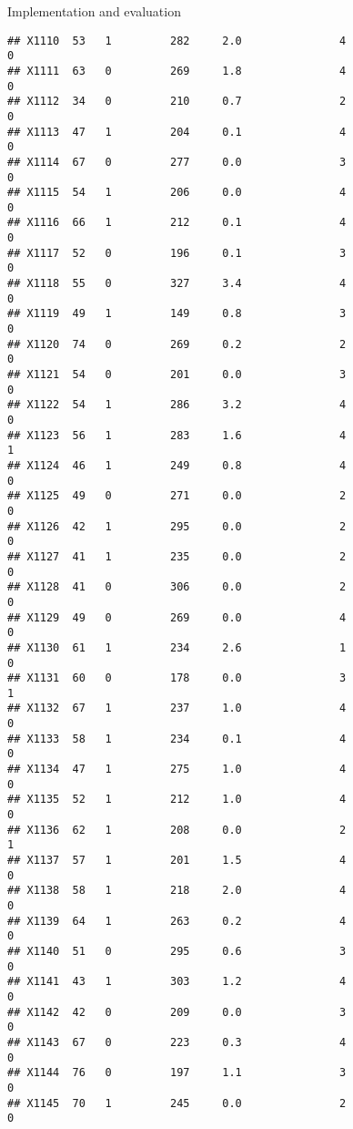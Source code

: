 \documentclass[
  ignorenonframetext,
]{beamer}
\begin{document}
\begin{frame}[fragile]{Implementation and evaluation}
\begin{verbatim}
## X1110  53   1         282     2.0               4                   0
## X1111  63   0         269     1.8               4                   0
## X1112  34   0         210     0.7               2                   0
## X1113  47   1         204     0.1               4                   0
## X1114  67   0         277     0.0               3                   0
## X1115  54   1         206     0.0               4                   0
## X1116  66   1         212     0.1               4                   0
## X1117  52   0         196     0.1               3                   0
## X1118  55   0         327     3.4               4                   0
## X1119  49   1         149     0.8               3                   0
## X1120  74   0         269     0.2               2                   0
## X1121  54   0         201     0.0               3                   0
## X1122  54   1         286     3.2               4                   0
## X1123  56   1         283     1.6               4                   1
## X1124  46   1         249     0.8               4                   0
## X1125  49   0         271     0.0               2                   0
## X1126  42   1         295     0.0               2                   0
## X1127  41   1         235     0.0               2                   0
## X1128  41   0         306     0.0               2                   0
## X1129  49   0         269     0.0               4                   0
## X1130  61   1         234     2.6               1                   0
## X1131  60   0         178     0.0               3                   1
## X1132  67   1         237     1.0               4                   0
## X1133  58   1         234     0.1               4                   0
## X1134  47   1         275     1.0               4                   0
## X1135  52   1         212     1.0               4                   0
## X1136  62   1         208     0.0               2                   1
## X1137  57   1         201     1.5               4                   0
## X1138  58   1         218     2.0               4                   0
## X1139  64   1         263     0.2               4                   0
## X1140  51   0         295     0.6               3                   0
## X1141  43   1         303     1.2               4                   0
## X1142  42   0         209     0.0               3                   0
## X1143  67   0         223     0.3               4                   0
## X1144  76   0         197     1.1               3                   0
## X1145  70   1         245     0.0               2                   0

\end{verbatim}
\end{frame}
\end{document}
